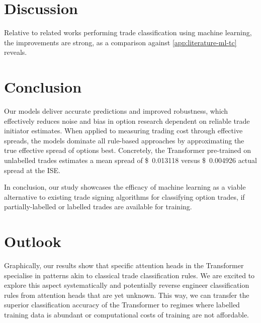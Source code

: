 \section{Discussion}\label{sec:discussion}

Relative to related works performing trade classification using machine learning, the improvements are strong, as a comparison against \cref{app:literature-ml-tc} reveals.

\newpage
\section{Conclusion}\label{sec:conclusion}

Our models deliver accurate predictions and improved robustness, which effectively reduces noise and bias in option research dependent on reliable trade initiator estimates. When applied to measuring trading cost through effective spreads, the models dominate all rule-based approaches by approximating the true effective spread of options best. Concretely, the Transformer pre-trained on unlabelled trades estimates a mean spread of  \SI[round-mode=places, round-precision=3]{0.013118}[\$]{} versus \SI[round-mode=places, round-precision=3]{0.004926}[\$]{} actual spread at the \gls{ISE}.

In conclusion, our study showcases the efficacy of machine learning as a viable alternative to existing trade signing algorithms for classifying option trades, if partially-labelled or labelled trades are available for training. 

\newpage
\section{Outlook}\label{sec:outlook}

Graphically, our results show that specific attention heads in the Transformer specialise in patterns akin to classical trade classification rules. We are excited to explore this aspect systematically and potentially reverse engineer classification rules from attention heads that are yet unknown. This way, we can transfer the superior classification accuracy of the Transformer to regimes where labelled training data is abundant or computational costs of training are not affordable.